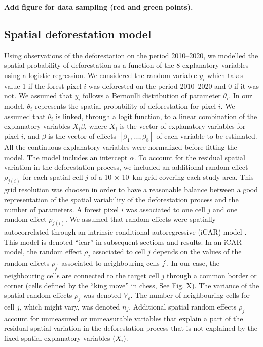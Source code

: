 \documentclass[12pt,]{article}
\begin{document}
\textbf{Add figure for data sampling (red and green points).}

\hypertarget{spatial-deforestation-model}{%
\subsection{Spatial deforestation model}\label{spatial-deforestation-model}}

Using observations of the deforestation on the period 2010--2020, we modelled the spatial probability of deforestation as a function of the 8 explanatory variables using a logistic regression. We considered the random variable \(y_i\) which takes value 1 if the forest pixel \(i\) was deforested on the period 2010--2020 and 0 if it was not. We assumed that \(y_i\) follows a Bernoulli distribution of parameter \(\theta_i\). In our model, \(\theta_i\) represents the spatial probability of deforestation for pixel \(i\). We assumed that \(\theta_i\) is linked, through a logit function, to a linear combination of the explanatory variables \(X_i \beta\), where \(X_i\) is the vector of explanatory variables for pixel \(i\), and \(\beta\) is the vector of effects \([\beta_1, \ldots, \beta_8]\) of each variable to be estimated. All the continuous explanatory variables were normalized before fitting the model. The model includes an intercept \(\alpha\). To account for the residual spatial variation in the deforestation process, we included an additional random effect \(\rho_{j(i)}\) for each spatial cell \(j\) of a 10 \(\times\) 10~km grid covering each study area. This grid resolution was choosen in order to have a reasonable balance between a good representation of the spatial variability of the deforestation process and the number of parameters. A forest pixel \(i\) was associated to one cell \(j\) and one random effect \(\rho_{j(i)}\). We assumed that random effects were spatially autocorrelated through an intrinsic conditional autoregressive (iCAR) model \citep{Besag1991, Banerjee2014}. This model is denoted ``icar'' in subsequent sections and results. In an iCAR model, the random effect \(\rho_j\) associated to cell \(j\) depends on the values of the random effects \(\rho_{j^{\prime}}\) associated to neighbouring cells \(j^{\prime}\). In our case, the neighbouring cells are connected to the target cell \(j\) through a common border or corner (cells defined by the ``king move'' in chess, See Fig. X). The variance of the spatial random effects \(\rho_j\) was denoted \(V_{\rho}\). The number of neighbouring cells for cell \(j\), which might vary, was denoted \(n_j\). Additional spatial random effects \(\rho_j\) account for unmeasured or unmeasurable variables \citep{Clark2005} that explain a part of the residual spatial variation in the deforestation process that is not explained by the fixed spatial explanatory variables (\(X_i\)).
\end{document}
